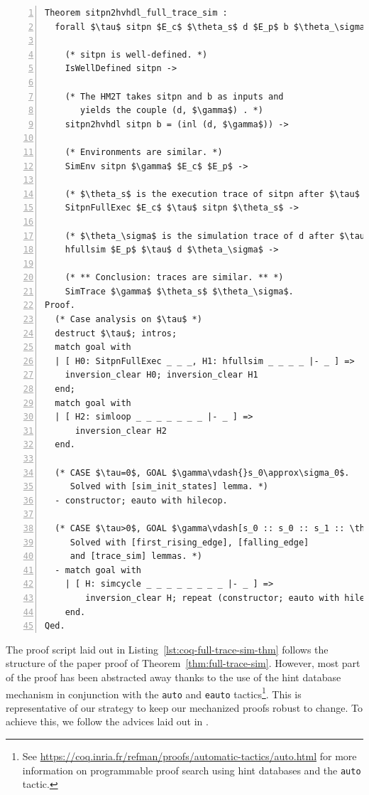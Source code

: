 \documentclass[pdflatex,sn-mathphys]{sn-jnl}%
\theoremstyle{thmstyleone}%
\theoremstyle{thmstyletwo}%
\theoremstyle{thmstylethree}%
\begin{document}
\begin{lstlisting}[language=Coq,caption={\coq{} implementation of
Theorem~\ref{thm:full-trace-sim} and the mechanized version of its
proof.},label={lst:coq-full-trace-sim-thm},
framexleftmargin=1.5em,
xleftmargin=2em,
numbers=left,
numberstyle=\tiny\ttfamily,
basicstyle=\fontsize{9}{11}\selectfont,
frame=tb]
Theorem sitpn2hvhdl_full_trace_sim :
  forall $\tau$ sitpn $E_c$ $\theta_s$ d $E_p$ b $\theta_\sigma$ $\gamma$,

    (* sitpn is well-defined. *)
    IsWellDefined sitpn ->
    
    (* The HM2T takes sitpn and b as inputs and 
       yields the couple (d, $\gamma$) . *)
    sitpn2hvhdl sitpn b = (inl (d, $\gamma$)) ->

    (* Environments are similar. *)
    SimEnv sitpn $\gamma$ $E_c$ $E_p$ ->
    
    (* $\theta_s$ is the execution trace of sitpn after $\tau$ clock cycles. *)
    SitpnFullExec $E_c$ $\tau$ sitpn $\theta_s$ ->    
    
    (* $\theta_\sigma$ is the simulation trace of d after $\tau$ clock cycles. *)
    hfullsim $E_p$ $\tau$ d $\theta_\sigma$ ->
    
    (* ** Conclusion: traces are similar. ** *)
    SimTrace $\gamma$ $\theta_s$ $\theta_\sigma$.
Proof.
  (* Case analysis on $\tau$ *)
  destruct $\tau$; intros;
  match goal with
  | [ H0: SitpnFullExec _ _ _, H1: hfullsim _ _ _ _ |- _ ] =>
    inversion_clear H0; inversion_clear H1
  end;
  match goal with
  | [ H2: simloop _ _ _ _ _ _ _ |- _ ] =>
      inversion_clear H2
  end.

  (* CASE $\tau=0$, GOAL $\gamma\vdash{}s_0\approx\sigma_0$. 
     Solved with [sim_init_states] lemma. *)
  - constructor; eauto with hilecop.

  (* CASE $\tau>0$, GOAL $\gamma\vdash[s_0 :: s_0 :: s_1 :: \theta_s]\sim[\sigma_0 :: \sigma'_0 :: \sigma_1 :: \theta_\sigma]$.   
     Solved with [first_rising_edge], [falling_edge] 
     and [trace_sim] lemmas. *)
  - match goal with
    | [ H: simcycle _ _ _ _ _ _ _ _ |- _ ] =>
        inversion_clear H; repeat (constructor; eauto with hilecop)
    end.
Qed.
\end{lstlisting}

The proof script laid out in Listing~\ref{lst:coq-full-trace-sim-thm}
follows the structure of the paper proof of
Theorem~\ref{thm:full-trace-sim}. However, most part of the proof has
been abstracted away thanks to the use of the hint database mechanism
in conjunction with the \texttt{auto} and \texttt{eauto}
tactics\footnote{See
  \url{https://coq.inria.fr/refman/proofs/automatic-tactics/auto.html}
  for more information on programmable proof search using hint
  databases and the \texttt{auto} tactic.}.  This is representative of
our strategy to keep our mechanized proofs robust to change. To
achieve this, we follow the advices laid out in \cite{Chlipala2010}.
\end{document}
